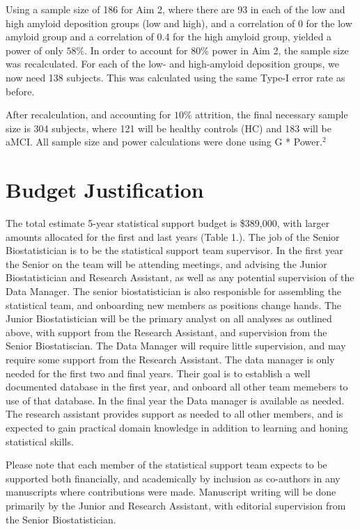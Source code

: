\documentclass[
]{article}
\begin{document}
\begin{doublespace}
Using a sample size of 186 for Aim 2, where there are 93 in each of the
low and high amyloid deposition groups (low and high), and a correlation
of 0 for the low amyloid group and a correlation of 0.4 for the high
amyloid group, yielded a power of only \(58\)\%. In order to account for
\(80\)\% power in Aim 2, the sample size was recalculated. For each of
the low- and high-amyloid deposition groups, we now need 138 subjects.
This was calculated using the same Type-I error rate as before.

After recalculation, and accounting for \(10\)\% attrition, the final
necessary sample size is 304 subjects, where 121 will be healthy controls (HC) and 183 will
be aMCI. All sample size and power calculations were done using G * Power.\(^2\)
\section{Budget Justification}
The total estimate 5-year statistical support budget is \$389,000, with
larger amounts allocated for the first and last years (Table 1.). The
job of the Senior Biostatistician is to be the statistical support team
supervisor. In the first year the Senior on the team will be attending
meetings, and advising the Junior Biostatistician and Research Assistant, as well as any
potential supervision of the Data Manager. The senior biostatistician is also responisble
for assembling the statistical team, and onboarding new members as positions
change hands. The Junior Biostatistician
will be the primary analyst on all analyses as outlined above, with support from the
Research Assistant, and supervision from the Senior Biostatiscian. The
Data Manager will require little supervision, and may require some
support from the Research Assistant. The data manager is only needed for
the first two and final years. Their goal is to establish a well documented
database in the first year, and onboard all other team memebers to use of
that database. In the final year the Data manager is available as needed.
The research assistant provides support as needed to all other members,
and is expected to gain practical domain knowledge in addition to learning
and honing statistical skills.

Please note that each member of the statistical support team expects to
be supported both financially, and academically by inclusion as
co-authors in any manuscripts where contributions were made. Manuscript
writing will be done primarily by the Junior and Research Assistant,
with editorial supervision from the Senior Biostatistician.
\end{doublespace}
\end{document}
